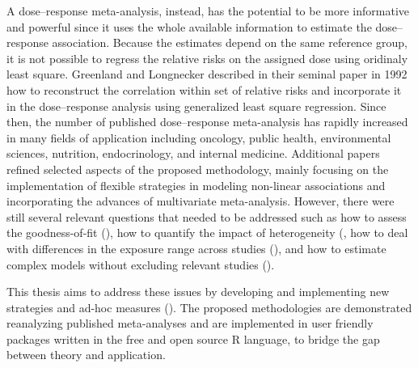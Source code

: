 \documentclass[11pt,a4paper,twoside,openany]{book}\usepackage{knitr}
\begin{document}
{A dose--response meta-analysis, instead, has the potential to be more informative and powerful since it uses the whole available information to estimate the dose--response association. Because the estimates depend on the same reference group, it is not possible to regress the relative risks on the assigned dose using oridinaly least square. Greenland and Longnecker described in their seminal paper in 1992 how to reconstruct the correlation within set of relative risks and incorporate it in the dose--response analysis using generalized least square regression. Since then, the number of published dose--response meta-analysis has rapidly increased in many fields of application including oncology, public health, environmental sciences, nutrition, endocrinology, and internal medicine. 
Additional papers refined selected aspects of the proposed methodology, mainly focusing on the implementation of flexible strategies in modeling non-linear associations and incorporating the advances of multivariate meta-analysis. However, there were still several relevant questions that needed to be addressed such as how to assess the goodness-of-fit (), how to quantify the impact of heterogeneity (, how to deal with differences in the exposure range across studies (), and how to estimate complex models without excluding relevant studies ().

This thesis aims to address these issues by developing and implementing new strategies and ad-hoc measures (). The proposed methodologies are demonstrated reanalyzing published meta-analyses and are implemented in user friendly packages written in the free and open source R language, to bridge the gap between theory and application.


%

}
\end{document}
